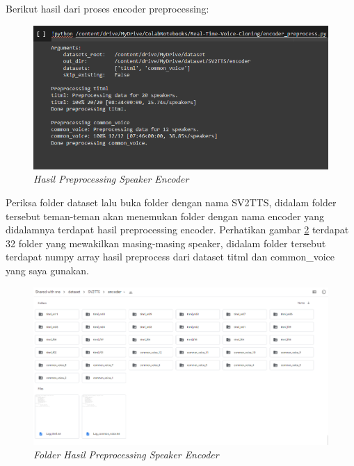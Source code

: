 \begin{enumerate}
Berikut hasil dari proses encoder preprocessing:
\begin{figure}[H]
    \centering
    \includegraphics[scale=0.5]{figures/hasil3}
    \caption{\textit{Hasil Preprocessing Speaker Encoder}}
    \label{hasil3}
\end{figure}

Periksa folder dataset lalu buka folder dengan nama SV2TTS, didalam folder tersebut teman-teman akan menemukan folder dengan nama encoder yang didalamnya terdapat hasil preprocessing encoder. Perhatikan gambar \ref{hasil4} terdapat 32 folder yang mewakilkan masing-masing speaker, didalam folder tersebut terdapat numpy array hasil preprocess dari dataset titml dan common\_voice yang saya gunakan.
\begin{figure}[H]
    \centering
    \includegraphics[scale=0.35]{figures/hasil4}
    \caption{\textit{Folder Hasil Preprocessing Speaker Encoder}}
    \label{hasil4}
\end{figure}


\end{enumerate}
